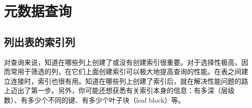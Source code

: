 \chapter{元数据查询}
\section{列出表的索引列}
对查询来说，知道在哪些列上创建了或没有创建索引很重要。对于选择性极高，因而常用于筛选的列，在它们上面创建索引可以极大地提高查询的性能。在表之间建立连接时，索引也很有用。知道在哪些列上创建了索引后，就在解决性能问题的路上迈出了第一步。另外，你可能还想获悉有关索引本身的信息：有多深（层级数）、有多少个不同的键、有多少个叶子块（leaf block）等。